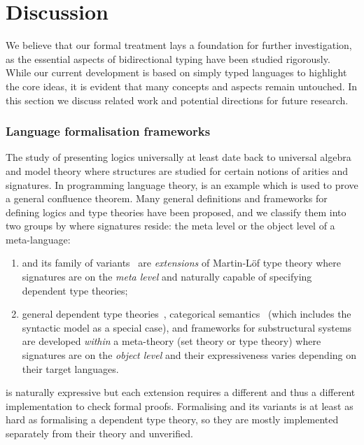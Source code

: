 
\section{Discussion} \label{sec:future}
We believe that our formal treatment lays a foundation for further investigation, as the essential aspects of bidirectional typing have been studied rigorously. 
While our current development is based on simply typed languages to highlight the core ideas, it is evident that many concepts and aspects remain untouched.
In this section we discuss related work and potential directions for future research.
\subsubsection{Language formalisation frameworks}

The study of presenting logics universally at least date back to universal algebra and model theory where structures are studied for certain notions of arities and signatures.
In programming language theory,  is an example which is used to prove a general confluence theorem.
Many general definitions and frameworks for defining logics and type theories have been proposed, and we classify them into two groups by where signatures reside: the meta level or the object level of a meta-language:
\begin{enumerate}
  \item {} and its family of variants~\cite{Harper2007,Assaf2016,Felicissimo2023} are \emph{extensions} of Martin-L\"of type theory where signatures are on the \emph{meta level} and naturally capable of specifying dependent type theories;
\item general dependent type theories~\cite{Bauer2020,Haselwarter2021,Bauer2022a,Uemura2021}, categorical semantics~\cite{Fiore1999,Tanaka2006,Tanaka2006a,Fiore2010,Hamana2011,Fiore2013,Arkor2020,Fiore2022} (which includes the syntactic model as a special case), and frameworks for substructural systems~\cite{Tanaka2006,Tanaka2006a,Wood2022} are developed \emph{within} a meta-theory (set theory or type theory) where signatures are on the \emph{object level} and their expressiveness varies depending on their target languages.
\end{enumerate}

\LF is naturally expressive but each extension requires a different \LF and thus a different implementation to check formal \LF proofs.
Formalising \LF and its variants is at least as hard as formalising a dependent type theory, so they are mostly implemented separately from their theory and unverified.

